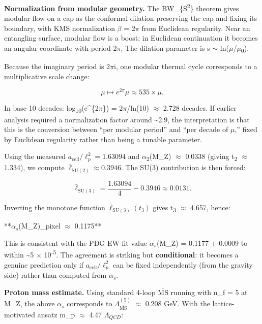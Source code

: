 \documentclass[11pt,a4paper]{article}
\theoremstyle{remark}
\begin{document}
\textbf{Normalization from modular geometry.} The BW\_\{S\textsuperscript{2}\} theorem gives modular flow on a cap as the conformal dilation preserving the cap and fixing its boundary, with KMS normalization \ensuremath{\beta} = 2\ensuremath{\pi} from Euclidean regularity. Near an entangling surface, modular flow is a boost; in Euclidean continuation it becomes an angular coordinate with period 2\ensuremath{\pi}. The dilation parameter is s \ensuremath{\sim} ln(\ensuremath{\mu}/\ensuremath{\mu}\textsubscript{0}).

Because the imaginary period is 2\ensuremath{\pi}i, one modular thermal cycle corresponds to a multiplicative scale change:

\[
\mu \mapsto e^{2\pi} \mu \approx 535 \times \mu.
\]

In base-10 decades: log\textsubscript{10}(e\^{}\{2\ensuremath{\pi}\}) = 2\ensuremath{\pi}/ln(10) \ensuremath{\approx} 2.728 decades. If earlier analysis required a normalization factor around \textasciitilde2.9, the interpretation is that this is the conversion between ``per modular period'' and ``per decade of \ensuremath{\mu},'' fixed by Euclidean regularity rather than being a tunable parameter.

Using the measured \(a_{\mathrm{cell}}/\ell_p^2 = 1.63094\) and \ensuremath{\alpha}\textsubscript{2}(M\_Z) \ensuremath{\approx} 0.0338
(giving t\textsubscript{2} \ensuremath{\approx} 1.334), we compute \(\bar{\ell}_{\mathrm{SU}(2)} \ensuremath{\approx} 0.3946\). The
SU(3) contribution is then forced:

\[
\bar{\ell}_{\mathrm{SU}(3)} = \frac{1.63094}{4} - 0.3946 \approx 0.0131.
\]

Inverting the monotone function \(\bar{\ell}_{\mathrm{SU}(3)}(t_3)\) gives
t\textsubscript{3} \ensuremath{\approx} 4.657, hence:

**$\alpha_s$(M\_Z)\textbar\_pixel \ensuremath{\approx} 0.1175**

This is consistent with the PDG EW-fit value $\alpha_s$(M\_Z) = 0.1177 \ensuremath{\pm} 0.0009 to within
\textasciitilde5 \ensuremath{\times} 10\textsuperscript{-5}. The agreement is striking but \textbf{conditional}: it becomes a
genuine prediction only if \(a_{\mathrm{cell}}/\ell_p^2\) can be fixed
independently (from the gravity side) rather than computed from $\alpha_s$.

\textbf{Proton mass estimate.} Using standard 4-loop \(\overline{\mathrm{MS}}\) running
with n\_f = 5 at M\_Z, the above $\alpha_s$ corresponds to
$\Lambda_{\overline{\mathrm{MS}}}^{(5)}$ \ensuremath{\approx} 0.208 GeV. With the lattice-motivated ansatz
m\_p \ensuremath{\approx} 4.47 $\Lambda_{QCD}$:
\end{document}

